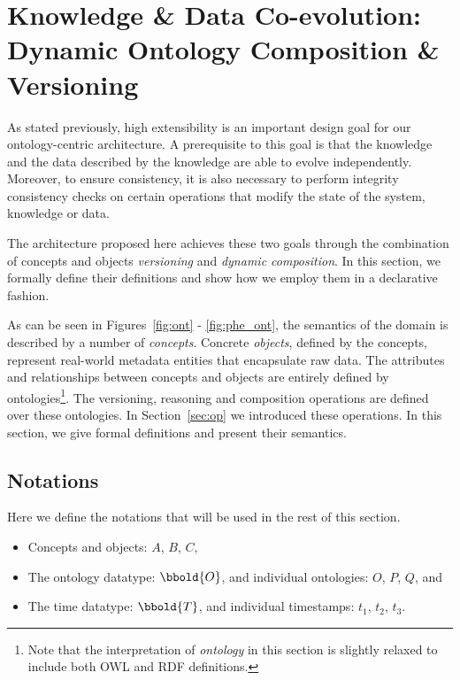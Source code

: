 \documentclass[preprint,12pt]{elsarticle}
\begin{document}
\section{Knowledge \& Data Co-evolution: Dynamic Ontology Composition \& Versioning}\label{sec:spec}

As stated previously, high extensibility is an important design goal for our ontology-centric architecture. A prerequisite to this goal is that the knowledge and the data described by the knowledge are able to evolve independently. Moreover, to ensure consistency, it is also necessary to perform integrity consistency checks on certain operations that modify the state of the system, knowledge or data.

The architecture proposed here achieves these two goals through the combination of concepts and objects \emph{versioning} and \emph{dynamic composition}. In this section, we formally define their definitions and show how we employ them in a declarative fashion.

As can be seen in Figures~\ref{fig:ont} - \ref{fig:phe_ont}, the semantics of the domain is described by a number of \emph{concepts}. Concrete \emph{objects}, defined by the concepts, represent real-world metadata entities that encapsulate raw data. The attributes and relationships between concepts and objects are entirely defined by ontologies\footnote{Note that the interpretation of \emph{ontology} in this section is slightly relaxed to include both OWL and RDF definitions.}. The versioning, reasoning and composition operations are defined over these ontologies. In Section~\ref{sec:op} we introduced these operations. In this section, we give formal definitions and present their semantics.

\subsection{Notations}
Here we define the notations that will be used in the rest of this section.
\begin{itemize}
\item Concepts and objects: $A$, $B$, $C$,
\item The ontology datatype: $\bbold{O}$, and individual ontologies: $O$, $P$, $Q$, and 
\item The time datatype: $\bbold{T}$, and individual timestamps: $t_1$, $t_2$, $t_3$.
\end{itemize}
\end{document}
